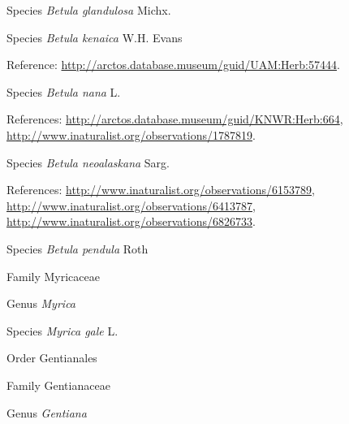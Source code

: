 \documentclass[9pt, article]{memoir}
\begin{document}
\begin{multicols}{2}
\vspace{6pt}\noindent\hspace{36pt}Species \textit{Betula glandulosa} Michx.


\vspace{6pt}\noindent\hspace{36pt}Species \textit{Betula kenaica} W.H. Evans


\vspace{6pt}Reference: 
\url{http://arctos.database.museum/guid/UAM:Herb:57444}.

\vspace{6pt}\noindent\hspace{36pt}Species \textit{Betula nana} L.


\vspace{6pt}References: 
\url{http://arctos.database.museum/guid/KNWR:Herb:664}, 
\url{http://www.inaturalist.org/observations/1787819}.

\vspace{6pt}\noindent\hspace{36pt}Species \textit{Betula neoalaskana} Sarg.


\vspace{6pt}References: 
\url{http://www.inaturalist.org/observations/6153789}, 
\url{http://www.inaturalist.org/observations/6413787}, 
\url{http://www.inaturalist.org/observations/6826733}.

\vspace{6pt}\noindent\hspace{36pt}Species \textit{Betula pendula} Roth


\vspace{6pt}\noindent\hspace{24pt}Family Myricaceae


\vspace{6pt}\noindent\hspace{30pt}Genus \textit{Myrica}


\vspace{6pt}\noindent\hspace{36pt}Species \textit{Myrica gale} L.


\vspace{6pt}\noindent\hspace{18pt}Order Gentianales


\vspace{6pt}\noindent\hspace{24pt}Family Gentianaceae


\vspace{6pt}\noindent\hspace{30pt}Genus \textit{Gentiana}



\end{multicols}
\end{document}
